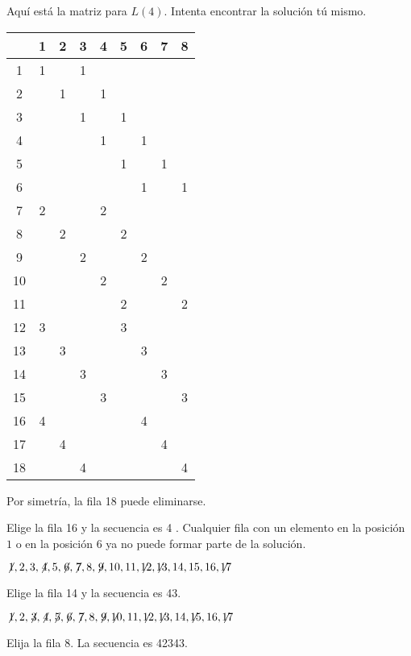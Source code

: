 Aquí está la matriz para $L(4)$. Intenta encontrar la solución tú mismo.
\begin{center}
\addtolength{\tabcolsep}{4pt}
\begin{tabular}{|c||c|c|c|c|c|c|c|c|}
\hline
&1&2&3&4&5&6&7&8\\\hline\hline
1&1&&1&&&&&\\\hline
2&&1&&1&&&&\\\hline
3&&&1&&1&&&\\\hline
4&&&&1&&1&&\\\hline
5&&&&&1&&1&\\\hline
6&&&&&&1&&1\\\hline
7&2&&&2&&&&\\\hline
8&&2&&&2&&&\\\hline
9&&&2&&&2&&\\\hline
10&&&&2&&&2&\\\hline
11&&&&&2&&&2\\\hline
12&3&&&&3&&&\\\hline
13&&3&&&&3&&\\\hline
14&&&3&&&&3&\\\hline
15&&&&3&&&&3\\\hline
16&4&&&&&4&&\\\hline
17&&4&&&&&4&\\\hline
18&&&4&&&&&4\\\hline
\end{tabular}
\end{center}
Por simetría, la fila 18 puede eliminarse.

\smallskip

\noindent Elige la fila 16 y la secuencia es 4\textvisiblespace\textvisiblespace\textvisiblespace{} \textvisiblespace\textvisiblespace.
Cualquier fila con un elemento en la posición $1$ o en la posición $6$ ya no puede formar parte de la solución.

$\not\! 1,2,3,\not\! 4,5,\not\! 6,\not\! 7,8,\not\! 9,10,11,\not\!\! 12,\not\!\! 13,14,15,16,\not\!\! 17$

\noindent Elige la fila 14 y la secuencia es 4\textvisiblespace{}3\textvisiblespace.

$\not\! 1,2,\not\! 3,\not\! 4,\not\! 5,\not\! 6,\not\! 7,8,\not\! 9,\not\!\! 10,11,\not\!\! 12,\not\!\! 13,14, \not\!\! 15,16,\not\!\! 17$

\noindent Elija la fila 8. La secuencia es 4{}2{}34{}3\textvisiblespace.

